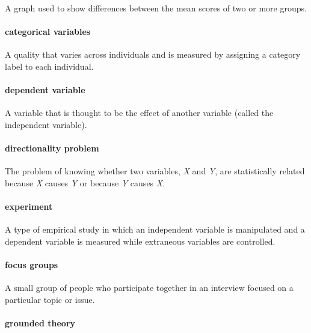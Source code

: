 \documentclass[
]{krantz}
\begin{document}
A graph used to show differences between the mean scores of two or more groups.

\paragraph*{categorical variables}\label{categorical-variables}

A quality that varies across individuals and is measured by assigning a category label to each individual.

\paragraph*{dependent variable}\label{dependent-variable}

A variable that is thought to be the effect of another variable (called the independent variable).

\paragraph*{directionality problem}\label{directionality-problem}

The problem of knowing whether two variables, \emph{X} and \emph{Y}, are statistically related because \emph{X} causes \emph{Y} or because \emph{Y} causes \emph{X}.

\paragraph*{experiment}\label{experiment}

A type of empirical study in which an independent variable is manipulated and a dependent variable is measured while extraneous variables are controlled.

\paragraph*{focus groups}\label{focus-groups}

A small group of people who participate together in an interview focused on a particular topic or issue.

\paragraph*{grounded theory}\label{grounded-theory}
\end{document}

